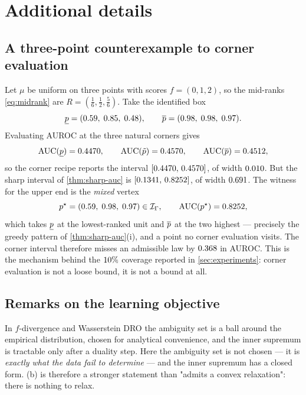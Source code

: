 \section{Additional details}
\label{app:details}

\subsection{A three-point counterexample to corner evaluation}
\label{app:counterexample}

Let $\mu$ be uniform on three points with scores $f=(0,1,2)$, so the mid-ranks
\eqref{eq:midrank} are $R = (\tfrac16,\tfrac12,\tfrac56)$. Take the identified
box
\[
  \underline{p} = (0.59,\;0.85,\;0.48),
  \qquad
  \overline{p} = (0.98,\;0.98,\;0.97).
\]
Evaluating AUROC at the three natural corners gives
\[
  \operatorname{AUC}(\underline{p})=0.4470,\qquad \operatorname{AUC}(\tilde p)=0.4570,\qquad \operatorname{AUC}(\overline{p})=0.4512,
\]
so the corner recipe reports the interval $[0.4470,\,0.4570]$, of width $0.010$.
But the sharp interval of \cref{thm:sharp-auc} is $[0.1341,\,0.8252]$, of width
$0.691$. The witness for the upper end is the \emph{mixed} vertex
\[
  p^\star = (0.59,\;0.98,\;0.97) \in \mathcal{I}_\Gamma,
  \qquad \operatorname{AUC}(p^\star) = 0.8252,
\]
which takes $\underline{p}$ at the lowest-ranked unit and $\overline{p}$ at the two highest ---
precisely the greedy pattern of \cref{thm:sharp-auc}(i), and a point no corner
evaluation visits. The corner interval therefore misses an admissible law by
$0.368$ in AUROC. This is the mechanism behind the $10\%$ coverage reported in
\cref{sec:experiments}: corner evaluation is not a loose bound, it is not a
bound at all.

\subsection{Remarks on the learning objective}
\label{app:learning-remarks}

\begin{remark}
\label{rem:dro}
In $f$-divergence and Wasserstein DRO \citep{namkoong2016stochastic,
duchi2021learning, sagawa2020distributionally} the ambiguity set is a ball
around the empirical distribution, chosen for analytical convenience, and the
inner supremum is tractable only after a duality step. Here the ambiguity set is
not chosen --- it is \emph{exactly what the data fail to determine} --- and the
inner supremum has a closed form. (b) is therefore a stronger
statement than "admits a convex relaxation": there is nothing to relax.
\end{remark}

